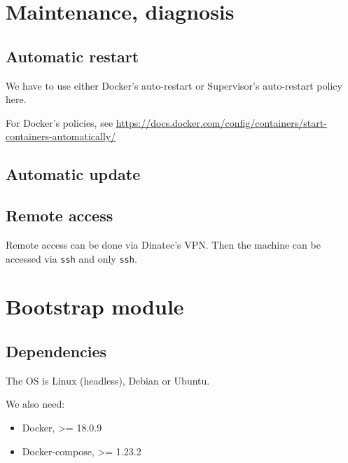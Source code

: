 \section{Maintenance, diagnosis}

\subsection{Automatic restart}


We have to use either Docker's auto-restart or Supervisor's auto-restart policy here.

For Docker's policies, see \url{https://docs.docker.com/config/containers/start-containers-automatically/}


\subsection{Automatic update}




\subsection{Remote access}

Remote access can be done via Dinatec's VPN. Then the machine can be accessed via \texttt{ssh} and only \texttt{ssh}.



\section{Bootstrap module}

\subsection{Dependencies}

The OS is Linux (headless), Debian or Ubuntu.


We also need:

\begin{itemize}
    \item Docker, >= 18.0.9
    \item Docker-compose, >= 1.23.2
\end{itemize}



